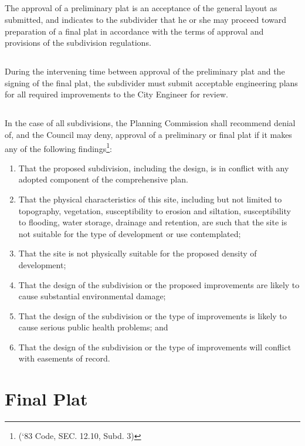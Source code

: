 \subsection{}
The approval of a preliminary plat is an acceptance of the general layout as submitted, and indicates to the subdivider that he or she may proceed toward preparation of a final plat in accordance with the terms of approval and provisions of the subdivision regulations.
\subsection{}
During the intervening time between approval of the preliminary plat and the signing of the final plat, the subdivider must submit acceptable engineering plans for all required improvements to the City Engineer for review.
\subsection{}
In the case of all subdivisions, the Planning Commission shall recommend denial of, and the Council may deny, approval of a preliminary or final plat if it makes any of the following findings\footnote{(‘83 Code, SEC. 12.10, Subd. 3)}:
\begin{enumerate}[{\indent}1)]
    \item That the proposed subdivision, including the design, is in conflict with any adopted component of the comprehensive plan.
    \item That the physical characteristics of this site, including but not limited to topography, vegetation, susceptibility to erosion and siltation, susceptibility to flooding, water storage, drainage and retention, are such that the site is not suitable for the type of development or use contemplated;
    \item That the site is not physically suitable for the proposed density of development;
    \item That the design of the subdivision or the proposed improvements are likely to cause substantial environmental damage;
    \item That the design of the subdivision or the type of improvements is likely to cause serious public health problems; and
    \item That the design of the subdivision or the type of improvements will conflict with easements of record.
\end{enumerate}
\section{Final Plat}
